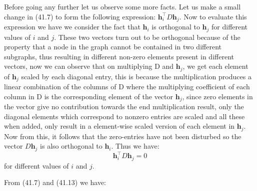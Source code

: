 \documentclass[english]{article}
\theoremstyle{plain}
\begin{document}
Before going any further let us observe some more facts. Let us make a small change in (41.7) to form the following expression:
$\boldsymbol{h}_{i}^{\top}D\boldsymbol{h}_{j}$. Now to evaluate this expression we have we consider the fact that $\boldsymbol{h}_{i}$ is orthogonal to $\boldsymbol{h}_{j}$ for different values of $i$ and $j$. These two vectors turn out to be orthogonal because of the property that a node in the graph cannot be contained in two different subgraphs, thus resulting in different non-zero elements present in different vectors, now we can observe that on multiplying D and $\boldsymbol{h}_{j}$, we get each element of $\boldsymbol{h}_{j}$ scaled by each diagonal entry, this is because the multiplication produces a linear combination of the columns of D where the multiplying coefficient of each column in D is the corresponding element of the vector $\boldsymbol{h}_{j}$, since zero elements in the vector give no contribution towards the end multiplication result, only the diagonal elements which correspond to nonzero entries are scaled and all these when added, only result in a element-wise scaled version of each element in $\boldsymbol{h}_{j}$. Now from this, it follows that the zero-entries have not been disturbed so the vector $D\boldsymbol{h}_{j}$ is also orthogonal to $\boldsymbol{h}_{i}$. Thus we have: 
\begin{equation}
\boldsymbol{h}_{i}^{\top}D\boldsymbol{h}_{j} = 0
\end{equation}
for different values of $i$ and $j$. 

From (41.7) and (41.13) we have:
\end{document}
